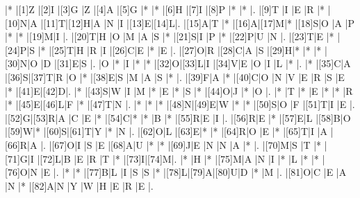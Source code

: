 \begin{Puzzle}{14}{20}
|*    |[1]Z |[2]I |[3]G |Z    |[4]A |[5]G |*    |*    |[6]H |[7]I |[8]P |*    |*    |.
|[9]T |I    |E    |R    |*    |[10]N|A    |[11]T|[12]H|A    |N    |I    |[13]E|[14]L|.
|[15]A|T    |*    |[16]A|[17]M|*    |[18]S|O    |A    |P    |*    |*    |[19]M|I    |.
|[20]T|H    |O    |M    |A    |S    |*    |[21]S|I    |P    |*    |[22]P|U    |N    |.
|[23]T|E    |*    |[24]P|S    |*    |[25]T|H    |R    |I    |[26]C|E    |*    |E    |.
|[27]O|R    |[28]C|A    |S    |[29]H|*    |*    |*    |[30]N|O    |D    |[31]E|S    |.
|O    |*    |I    |*    |*    |[32]O|[33]L|I    |[34]V|E    |O    |I    |L    |*    |.
|*    |[35]C|A    |[36]S|[37]T|R    |O    |*    |[38]E|S    |M    |A    |S    |*    |.
|[39]F|A    |*    |[40]C|O    |N    |V    |E    |R    |S    |E    |*    |[41]E|[42]D|.
|*    |[43]S|W    |I    |M    |*    |E    |*    |S    |*    |[44]O|J    |*    |O    |.
|*    |T    |*    |E    |*    |*    |R    |*    |[45]E|[46]L|F    |*    |[47]T|N    |.
|*    |*    |*    |[48]N|[49]E|W    |*    |*    |[50]S|O    |F    |[51]T|I    |E    |.
|[52]G|[53]R|A    |C    |E    |*    |[54]C|*    |*    |B    |*    |[55]R|E    |I    |.
|[56]R|E    |*    |[57]E|L    |[58]B|O    |[59]W|*    |[60]S|[61]T|Y    |*    |N    |.
|[62]O|L    |[63]E|*    |*    |[64]R|O    |E    |*    |[65]T|I    |A    |[66]R|A    |.
|[67]O|I    |S    |E    |[68]A|U    |*    |*    |[69]J|E    |N    |N    |A    |*    |.
|[70]M|S    |T    |*    |[71]G|I    |[72]L|B    |E    |R    |T    |*    |[73]I|[74]M|.
|*    |H    |*    |[75]M|A    |N    |I    |*    |L    |*    |*    |[76]O|N    |E    |.
|*    |*    |[77]B|L    |I    |S    |S    |*    |[78]L|[79]A|[80]U|D    |*    |M    |.
|[81]O|C    |E    |A    |N    |*    |[82]A|N    |Y    |W    |H    |E    |R    |E    |.
\end{Puzzle}

